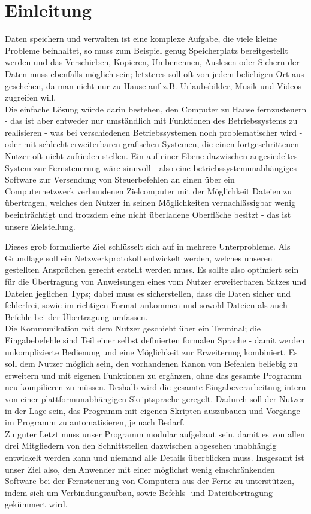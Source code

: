 \documentclass[12pt,a4paper]{scrartcl}
\begin{document}
\section*{Einleitung}
Daten speichern und verwalten ist eine komplexe Aufgabe, die viele kleine Probleme beinhaltet, so muss zum Beispiel genug Speicherplatz bereitgestellt werden und das Verschieben, Kopieren, Umbenennen, Auslesen oder Sichern der Daten muss ebenfalls möglich sein; letzteres soll oft von jedem beliebigen Ort aus geschehen, da man nicht nur zu Hause auf z.B. Urlaubsbilder, Musik und Videos zugreifen will.\\
Die einfache Lösung würde darin bestehen, den Computer zu Hause fernzusteuern - das ist aber entweder nur umständlich mit Funktionen des Betriebssystems zu realisieren - was bei verschiedenen Betriebssystemen noch problematischer wird - oder mit schlecht erweiterbaren grafischen Systemen, die einen fortgeschrittenen Nutzer oft nicht zufrieden stellen.
Ein auf einer Ebene dazwischen angesiedeltes System zur Fernsteuerung wäre sinnvoll - also eine betriebssystemunabhängiges Software zur Versendung von Steuerbefehlen an einen über ein Computernetzwerk verbundenen Zielcomputer mit der Möglichkeit Dateien zu übertragen, welches den Nutzer in seinen Möglichkeiten vernachlässigbar wenig beeinträchtigt und trotzdem eine nicht überladene Oberfläche besitzt - das ist unsere Zielstellung.

Dieses grob formulierte Ziel schlüsselt sich auf in mehrere Unterprobleme. Als Grundlage soll ein Netzwerkprotokoll entwickelt werden, welches unseren gestellten Ansprüchen gerecht erstellt werden muss. 
Es sollte also optimiert sein für die Übertragung von Anweisungen eines vom Nutzer erweiterbaren Satzes und Dateien jeglichen Typs; dabei muss es sicherstellen, dass die Daten sicher und fehlerfrei, sowie im richtigen Format ankommen und sowohl Dateien als auch Befehle bei der Übertragung umfassen.\\
Die Kommunikation mit dem Nutzer geschieht über ein Terminal; die Eingabebefehle sind Teil einer selbst definierten formalen Sprache - damit werden unkomplizierte Bedienung und eine Möglichkeit zur Erweiterung kombiniert.
Es soll dem Nutzer möglich sein, den vorhandenen Kanon von Befehlen beliebig zu erweitern und mit eigenen Funktionen zu ergänzen, ohne das gesamte Programm neu kompilieren zu müssen. Deshalb wird die gesamte Eingabeverarbeitung intern von einer plattformunabhängigen Skriptsprache geregelt.
Dadurch soll der Nutzer in der Lage sein, das Programm mit eigenen Skripten auszubauen und Vorgänge im Programm zu automatisieren, je nach Bedarf.\\
Zu guter Letzt muss unser Programm modular aufgebaut sein, damit es von allen drei Mitgliedern von den Schnittstellen dazwischen abgesehen unabhängig entwickelt werden kann und niemand alle Details überblicken muss.
Insgesamt ist unser Ziel also, den Anwender mit einer möglichst wenig einschränkenden Software bei der Fernsteuerung von Computern aus der Ferne zu unterstützen, indem sich um Verbindungsaufbau, sowie Befehls- und Dateiübertragung gekümmert wird.
\end{document}
